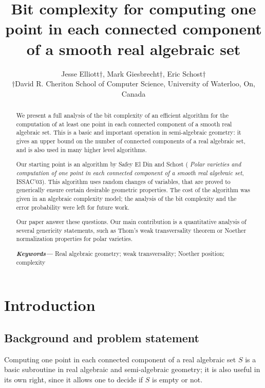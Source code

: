 \documentclass[a4paper]{article}
\title{Bit complexity for computing one point in each connected component of a smooth real algebraic set}
\author{Jesse Elliott$\dagger$, Mark Giesbrecht$\dagger$, Eric Schost$\dagger$  \\
        \small $\dagger$David R. Cheriton School of Computer Science, University of Waterloo, On, Canada \\
}
\date{} %
\providecommand{\keywords}[1]
{
  \small	
  \textbf{\textit{Keywords---}} #1
}
\begin{document}
%
\maketitle
%
\tableofcontents
\newpage
%
%
%
\begin{abstract}
We present a full analysis of the bit complexity of an efficient
  algorithm for the computation of at least one point in each
  connected component of a smooth real algebraic set. This is a basic
  and important operation in semi-algebraic geometry: it gives an
  upper bound on the number of connected components of a real
  algebraic set, and is 
  also used in many higher level algorithms.
  
  Our starting point is an algorithm by Safey El Din and Schost ({\em
    Polar varieties and computation of one point in each connected
    component of a smooth real algebraic set}, ISSAC'03). This
  algorithm uses random changes of variables, that are proved to
  generically ensure certain desirable geometric properties. The
  cost of the algorithm was given in an algebraic complexity
  model; the analysis of the bit complexity and the error probability
  were left for future work.

  Our paper answer these questions. Our main contribution is a
  quantitative analysis of several genericity statements, such as
  Thom's weak transversality theorem or Noether normalization
  properties for polar varieties.

\keywords{Real algebraic geometry; weak transversality; Noether
  position; complexity}
\end{abstract}
%
%
%




\section{Introduction}
\label{sec:overview}

%
\subsection{Background and problem statement}
%
Computing one point in each connected component of a real algebraic
set $S$ is a basic subroutine in real algebraic and semi-algebraic
geometry; it is also useful in its own right, since it allows one to
decide if $S$ is empty or not. 
\end{document}
